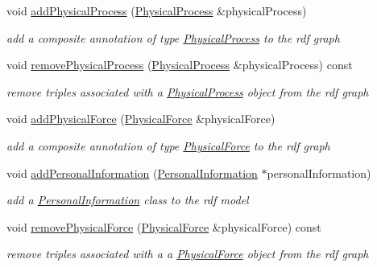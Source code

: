 \begin{DoxyCompactItemize}
void \hyperlink{classomexmeta_1_1Editor_ae4a608ecbe64f05c1b64efbeeb1fdeb1}{add\+Physical\+Process} (\hyperlink{classomexmeta_1_1PhysicalProcess}{Physical\+Process} \&physical\+Process)
\begin{DoxyCompactList}\small\item\em add a composite annotation of type \hyperlink{classomexmeta_1_1PhysicalProcess}{Physical\+Process} to the rdf graph \end{DoxyCompactList}\item 
void \hyperlink{classomexmeta_1_1Editor_a42640d74c6afe780738c906bdf346a78}{remove\+Physical\+Process} (\hyperlink{classomexmeta_1_1PhysicalProcess}{Physical\+Process} \&physical\+Process) const
\begin{DoxyCompactList}\small\item\em remove triples associated with a \hyperlink{classomexmeta_1_1PhysicalProcess}{Physical\+Process} object from the rdf graph \end{DoxyCompactList}\item 
void \hyperlink{classomexmeta_1_1Editor_a7833e03995f6323109c2db8d59104f6c}{add\+Physical\+Force} (\hyperlink{classomexmeta_1_1PhysicalForce}{Physical\+Force} \&physical\+Force)
\begin{DoxyCompactList}\small\item\em add a composite annotation of type \hyperlink{classomexmeta_1_1PhysicalForce}{Physical\+Force} to the rdf graph \end{DoxyCompactList}\item 
void \hyperlink{classomexmeta_1_1Editor_a1b2e0f5859fe2e2784ecff2a78f7f1f8}{add\+Personal\+Information} (\hyperlink{classomexmeta_1_1PersonalInformation}{Personal\+Information} $\ast$personal\+Information)
\begin{DoxyCompactList}\small\item\em add a \hyperlink{classomexmeta_1_1PersonalInformation}{Personal\+Information} class to the rdf model \end{DoxyCompactList}\item 
void \hyperlink{classomexmeta_1_1Editor_ad99187ec52bef1af440af5d9560f32c5}{remove\+Physical\+Force} (\hyperlink{classomexmeta_1_1PhysicalForce}{Physical\+Force} \&physical\+Force) const
\begin{DoxyCompactList}\small\item\em remove triples associated with a a \hyperlink{classomexmeta_1_1PhysicalForce}{Physical\+Force} object from the rdf graph \end{DoxyCompactList}\item 

\end{DoxyCompactItemize}
